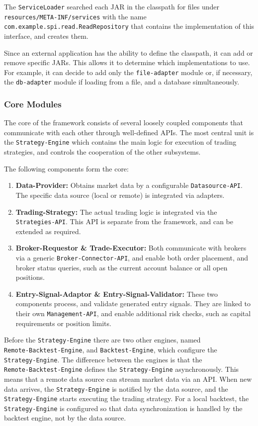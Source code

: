 The \verb|ServiceLoader| searched each JAR in the classpath for files under \verb|resources/META-INF/services| with the name \\\verb|com.example.spi.read.ReadRepository| that contains the implementation of this interface, and creates them.

Since an external application has the ability to define the classpath, it can add or remove specific JARs. This allows it to determine which implementations to use. For example, it can decide to add only the \verb|file-adapter| module or, if necessary, the \verb|db-adapter| module if loading from a file, and a database simultaneously.

\subsubsection{Core Modules}

The core of the framework consists of several loosely coupled components that communicate with each other through well-defined APIs. The most central unit is the \verb|Strategy-Engine| which contains the main logic for execution of trading strategies, and controls the cooperation of the other subsystems.

The following components form the core:

\begin{enumerate}
    \item \textbf{Data-Provider:} Obtains market data by a configurable \verb|Datasource-API|. The specific data source (local or remote) is integrated via adapters.
    \item \textbf{Trading-Strategy:} The actual trading logic is integrated via the \verb|Strategies-API|. This API is separate from the framework, and can be extended as required.
    \item \textbf{Broker-Requestor \& Trade-Executor:} Both communicate with brokers via a generic \verb|Broker-Connector-API|, and enable both order placement, and broker status queries, such as the current account balance or all open positions.
    \item \textbf{Entry-Signal-Adaptor \& Entry-Signal-Validator:} These two components process, and validate generated entry signals. They are linked to their own \verb|Management-API|, and enable additional risk checks, such as capital requirements or position limits.
\end{enumerate}

Before the \verb|Strategy-Engine| there are two other engines, named \\\verb|Remote-Backtest-Engine|, and \verb|Backtest-Engine|, which configure the \\\verb|Strategy-Engine|. The difference between the engines is that the \\\verb|Remote-Backtest-Engine| defines the \verb|Strategy-Engine| asynchronously. This means that a remote data source can stream market data via an API. When new data arrives, the \verb|Strategy-Engine| is notified by the data source, and the \verb|Strategy-Engine| starts executing the trading strategy. For a local backtest, the \verb|Strategy-Engine| is configured so that data synchronization is handled by the backtest engine, not by the data source.

